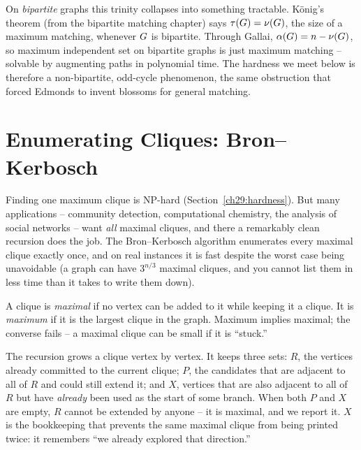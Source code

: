\begin{connectionbox}
On \emph{bipartite} graphs this trinity collapses into something tractable.
K\"onig's theorem (from the bipartite matching chapter) says $\tau(G)=\nu(G)$,
the size of a maximum matching, whenever $G$ is bipartite. Through Gallai,
$\alpha(G)=n-\nu(G)$, so maximum independent set on bipartite graphs is
just maximum matching -- solvable by augmenting paths in polynomial time. The
hardness we meet below is therefore a non-bipartite, odd-cycle phenomenon, the
same obstruction that forced Edmonds to invent blossoms for general matching.
\end{connectionbox}

\section{Enumerating Cliques: Bron--Kerbosch}
\label{ch29:bron-kerbosch}

Finding one maximum clique is NP-hard (Section~\ref{ch29:hardness}). But many
applications -- community detection, computational chemistry, the analysis of
social networks -- want \emph{all} maximal cliques, and there a remarkably clean
recursion does the job. The Bron--Kerbosch algorithm enumerates every maximal
clique exactly once, and on real instances it is fast despite the worst case
being unavoidable (a graph can have $3^{n/3}$ maximal cliques, and you cannot
list them in less time than it takes to write them down).

\begin{definition}
\label{ch29:def-maximal}
A clique is \emph{maximal} if no vertex can be added to it while keeping it a
clique. It is \emph{maximum} if it is the largest clique in the graph. Maximum
implies maximal; the converse fails -- a maximal clique can be small if it is
``stuck.''
\end{definition}

\begin{intuitionbox}
The recursion grows a clique vertex by vertex. It keeps three sets: $R$, the
vertices already committed to the current clique; $P$, the candidates that are
adjacent to all of $R$ and could still extend it; and $X$, vertices that are also
adjacent to all of $R$ but have \emph{already} been used as the start of some
branch. When both $P$ and $X$ are empty, $R$ cannot be extended by anyone -- it
is maximal, and we report it. $X$ is the bookkeeping that prevents the same
maximal clique from being printed twice: it remembers ``we already explored that
direction.''
\end{intuitionbox}

